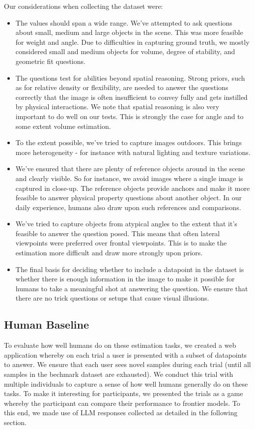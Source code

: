 Our considerations when collecting the dataset were:

\begin{itemize}
    \item The values should span a wide range. We've attempted to ask questions about small, medium and large objects in the scene. This was more feasible for weight and angle. Due to difficulties in capturing ground truth, we mostly considered small and medium objects for volume, degree of stability, and geometric fit questions.
    \item The questions test for abilities beyond spatial reasoning. Strong priors, such as for relative density or flexibility, are needed to answer the questions correctly that the image
    is often insufficient to convey fully and gets instilled by physical interactions. We note that spatial reasoning is also very important to do well on our tests. This is strongly the case for angle and to some extent volume estimation.
    \item To the extent possible, we've tried to capture images outdoors. This brings more heterogeneity - for instance with natural lighting and texture variations.
    \item We've ensured that there are plenty of reference objects around in the scene and clearly visible. So for instance, we avoid images where a single image is captured in close-up. The reference objects provide anchors and make it more feasible to answer physical property questions about another object. In our daily experience, humans also draw upon such references and comparisons.
    \item We've tried to capture objects from atypical angles to the extent that it's feasible to answer the question posed. This means that often lateral viewpoints were preferred over frontal viewpoints. This is to make the estimation more difficult and draw more strongly upon priors.
    \item The final basis for deciding whether to include a datapoint in the dataset is whether there is enough information in the image to make it possible for humans to take a meaningful shot at answering the question. We ensure that there are no trick questions or setups that cause visual illusions.
\end{itemize}

\subsection{Human Baseline}
To evaluate how well humans do on these estimation tasks, we created a web application whereby on each trial a user is presented with a subset of datapoints to answer. We ensure that each user sees novel samples during each trial (until all samples in the bechmark dataset are exhausted). We conduct this trial with multiple individuals to capture a sense of how well humans generally do on these tasks. To make it interesting for participants, we presented the trials as a game whereby the participant can compare their performance to frontier models. To this end, we made use of LLM responses collected as detailed in the following section. 

